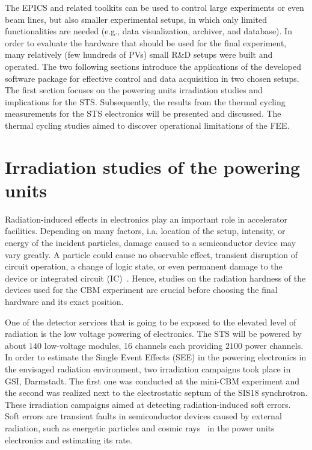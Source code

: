 The \gls{EPICS} and related toolkits can be used to control large experiments or even beam lines, but also smaller experimental setups, in which only limited functionalities are needed (e.g., data visualization, archiver, and database). In order to evaluate the hardware that should be used for the final experiment, many relatively (few hundreds of \glspl{PV}) small R\&D setups were built and operated. %
The two following sections introduce the applications of the developed software package for effective control and data acquisition in two chosen setups. The first section focuses on the powering units irradiation studies and implications for the \gls{STS}. Subsequently, the results from the thermal cycling measurements for the \gls{STS} electronics will be presented and discussed. The thermal cycling studies aimed to discover operational limitations of the \gls{FEE}. 


\section{Irradiation studies of the powering units}

Radiation-induced effects in electronics play an important role in accelerator facilities. Depending on many factors, i.a. location of the setup, intensity, or energy of the incident particles, damage caused to a semiconductor device may vary greatly. A particle could cause no observable effect, transient disruption of circuit operation, a change of logic state, or even permanent damage to the device or integrated circuit (IC)~\cite{dodd}. Hence, studies on the radiation hardness of the devices used for the \gls{CBM} experiment are crucial before choosing the final hardware and its exact position.

One of the detector services that is going to be exposed to the elevated level of radiation is the low voltage powering of electronics. The \gls{STS} will be powered by about $140$ low-voltage modules, 16 
channels each providing $2100$ power channels. In order to estimate the Single Event Effects (\gls{SEE}) in the powering electronics in the envisaged radiation environment, two irradiation campaigns took place in \gls{GSI}, Darmstadt.  The first one was conducted at the mini-CBM experiment and the second was realized next to the electrostatic septum of the SIS18 synchrotron. These irradiation campaigns aimed at detecting radiation-induced soft errors. Soft errors are transient faults in semiconductor devices caused by external radiation, such as energetic particles and cosmic rays~\cite{6338321} in the power units electronics and estimating its rate.

